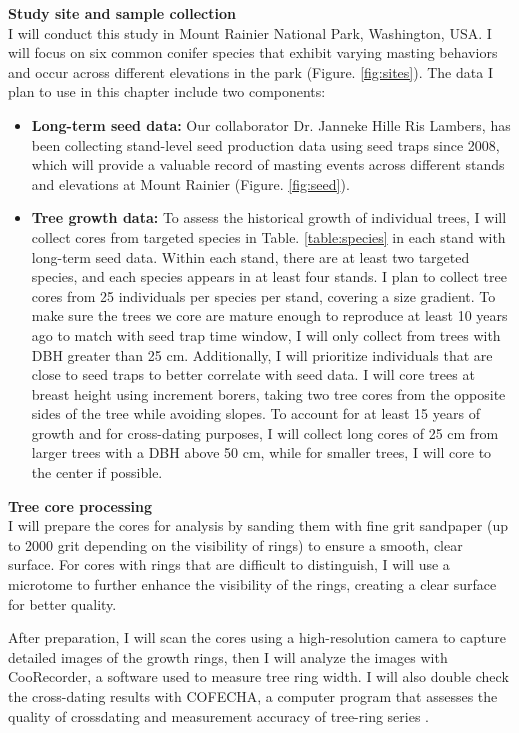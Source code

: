 \documentclass[11pt,letter]{article}
\begin{document}
\textbf{Study site and sample collection}\\
I will conduct this study in Mount Rainier National Park, Washington, USA. I will focus on six common conifer species that exhibit varying masting behaviors and occur across different elevations in the park (Figure. \ref{fig:sites}). The data I plan to use in this chapter include two components:	
\begin{itemize}
	\item \textbf{Long-term seed data:} Our collaborator Dr. Janneke Hille Ris Lambers, has been collecting stand-level seed production data using seed traps since 2008, which will provide a valuable record of masting events across different stands and elevations at Mount Rainier  (Figure. \ref{fig:seed}).
	\item \textbf{Tree growth data:}  To assess the historical growth of individual trees, I will collect cores from targeted species in Table. \ref{table:species} in each stand with long-term seed data. Within each stand, there are at least two targeted species, and each species appears in at least four stands. I plan to collect tree cores from 25 individuals per species per stand, covering a size gradient. To make sure the trees we core are mature enough to reproduce at least 10 years ago to match with seed trap time window, I will only collect from trees with DBH greater than 25 cm. Additionally, I will prioritize individuals that are close to seed traps to better correlate with seed data. I will core trees at breast height using increment borers, taking two tree cores from the opposite sides of the tree while avoiding slopes. To account for at least 15 years of growth and for cross-dating purposes, I will collect long cores of 25 cm from larger trees with a DBH above 50 cm, while for smaller trees, I will core to the center if possible.
	\end{itemize}
\textbf{Tree core processing}\\
I will prepare the cores for analysis by sanding them with fine grit sandpaper (up to 2000 grit depending on the visibility of rings) to ensure a smooth, clear surface. For cores with rings that are difficult to distinguish, I will use a microtome to further enhance the visibility of the rings, creating a clear surface for better quality.\par

After preparation, I will scan the cores using a high-resolution camera to capture detailed images of the growth rings, then I will analyze the images with CooRecorder, a software used to measure tree ring width. I will also double check the cross-dating results with COFECHA, a computer program that assesses the quality of crossdating and measurement accuracy of tree-ring series \citep{cook2013methods, speer2010fundamentals}.\par
\end{document}
